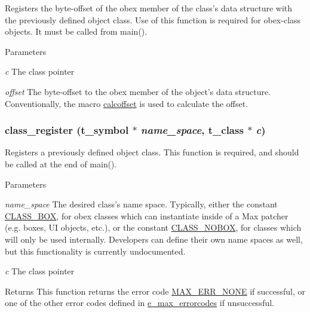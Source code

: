 Registers the byte-\/offset of the obex member of the class's data structure with the previously defined object class. Use of this function is required for obex-\/class objects. It must be called from {\ttfamily main()}.


\begin{DoxyParams}{Parameters}
\item[{\em c}]The class pointer \item[{\em offset}]The byte-\/offset to the obex member of the object's data structure. Conventionally, the macro \hyperlink{group__misc_gaad95899dfbc7b5b8fe11921643ef46f0}{calcoffset} is used to calculate the offset. \end{DoxyParams}
\hypertarget{group__class_ga0709af4aad9570f0cb91711a5c6d34d1}{
\subsubsection[{class\_\-register}]{ class\_\-register ({\bf t\_\-symbol} $\ast$ {\em name\_\-space}, \/  {\bf t\_\-class} $\ast$ {\em c})}}
\label{group__class_ga0709af4aad9570f0cb91711a5c6d34d1}


Registers a previously defined object class. This function is required, and should be called at the end of {\ttfamily main()}.


\begin{DoxyParams}{Parameters}
\item[{\em name\_\-space}]The desired class's name space. Typically, either the constant \hyperlink{group__class_gaf640c99a1fceb8158c2d1e77381b0320}{CLASS\_\-BOX}, for obex classes which can instantiate inside of a Max patcher (e.g. boxes, UI objects, etc.), or the constant \hyperlink{group__class_ga090d3cbc4f137661806fc1b72249a791}{CLASS\_\-NOBOX}, for classes which will only be used internally. Developers can define their own name spaces as well, but this functionality is currently undocumented. \item[{\em c}]The class pointer\end{DoxyParams}
\begin{DoxyReturn}{Returns}
This function returns the error code \hyperlink{group__misc_gga0764dd6c02b76cca7d053ae50555d69da6d22f77fef8b1e1b074cef5d29d935fd}{MAX\_\-ERR\_\-NONE} if successful, or one of the other error codes defined in \hyperlink{group__misc_ga0764dd6c02b76cca7d053ae50555d69d}{e\_\-max\_\-errorcodes} if unsuccessful. 
\end{DoxyReturn}

